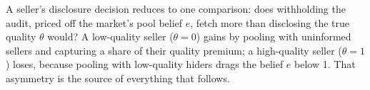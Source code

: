 A seller's disclosure decision reduces to one comparison: does withholding the audit, priced off the market's pool belief $e$, fetch more than disclosing the true quality $\theta$ would? A low-quality seller ($\theta=0$) gains by pooling with uninformed sellers and capturing a share of their quality premium; a high-quality seller ($\theta=1$) loses, because pooling with low-quality hiders drags the belief $e$ below 1. That asymmetry is the source of everything that follows.
